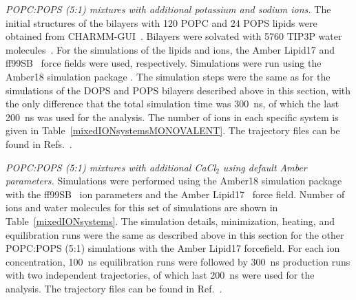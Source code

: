 \documentclass[journal=jpcbfk,manuscript=article]{achemso}
\begin{document}
\noindent
{\it POPC:POPS (5:1) mixtures with additional potassium and sodium ions.} 
The initial structures of the bilayers with 120 POPC and 24 POPS lipids were obtained from CHARMM-GUI~\cite{lee16,jo18}.
Bilayers were solvated with 5760 TIP3P water molecules~\cite{jorgensen1983comparison}. For the simulations of the lipids and ions,
the Amber Lipid17 \cite{gould18} and ff99SB~\cite{aqvist90} force fields were used, respectively.
Simulations were run using the Amber18 simulation package \cite{amber18md}. 
The simulation steps were the same as for the simulations of the
DOPS and POPS bilayers described above in this section, with the only difference that the total simulation time was 300~ns, of which the last 200~ns
was used for the analysis. The number of ions in each specific system is given in Table~\ref{mixedIONsystemsMONOVALENT}.
The trajectory files can be found in Refs.~.

\noindent
{\it POPC:POPS (5:1) mixtures with additional CaCl$_2$ using default Amber parameters.} 
Simulations were performed using the Amber18 simulation package \cite{amber18md} with the ff99SB~\cite{aqvist90} ion parameters and the Amber Lipid17~\cite{gould18} force field. 
Number of ions and water molecules for this set of simulations are shown in Table~\ref{mixedIONsystems}.
The simulation details, minimization, heating, and equilibration runs were the same as described above in this section for the other POPC:POPS (5:1) simulations with the Amber Lipid17 forcefield. 
For each ion concentration, 100~ns equilibration runs were followed by 300~ns production runs with two independent trajectories, of which last 200~ns were used for the analysis.
The trajectory files can be found in Ref.~.
\end{document}
